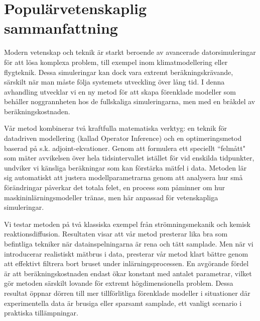 

{\let\cleardoublepage\relax
 \let\clearpage\relax

 \newpage
 
 \chapter*{Populärvetenskaplig sammanfattning}

 \vspace{-1.5cm}

Modern vetenskap och teknik är starkt beroende av avancerade datorsimuleringar för att lösa komplexa problem, till exempel inom klimatmodellering eller flygteknik. Dessa simuleringar kan dock vara extremt beräkningskrävande, särskilt när man måste följa systemets utveckling över lång tid. I denna avhandling utvecklar vi en ny metod för att skapa förenklade modeller som behåller noggrannheten hos de fullskaliga simuleringarna, men med en bråkdel av beräkningskostnaden.

Vår metod kombinerar två kraftfulla matematiska verktyg: en teknik för datadriven modellering (kallad Operator Inference) och en optimeringsmetod baserad på s.k. adjoint-ekvationer. Genom att formulera ett speciellt ``felmått" som mäter avvikelsen över hela tidsintervallet istället för vid enskilda tidpunkter, undviker vi känsliga beräkningar som kan förstärka mätfel i data. Metoden lär sig automatiskt att justera modellparametrarna genom att analysera hur små förändringar påverkar det totala felet, en process som påminner om hur maskininlärningsmodeller tränas, men här anpassad för vetenskapliga simuleringar.

Vi testar metoden på två klassiska exempel från strömningsmekanik och kemisk reaktionsdiffusion. Resultaten visar att vår metod presterar lika bra som befintliga tekniker när datainspelningarna är rena och tätt samplade. Men när vi introducerar realistiskt mätbrus i data, presterar vår metod klart bättre genom att effektivt filtrera bort bruset under inlärningsprocessen. En avgörande fördel är att beräkningskostnaden endast ökar konstant med antalet parametrar, vilket gör metoden särskilt lovande för extremt högdimensionella problem. Dessa resultat öppnar dörren till mer tillförlitliga förenklade modeller i situationer där experimentella data är brusiga eller sparsamt samplade, ett vanligt scenario i praktiska tillämpningar. 
 

}
